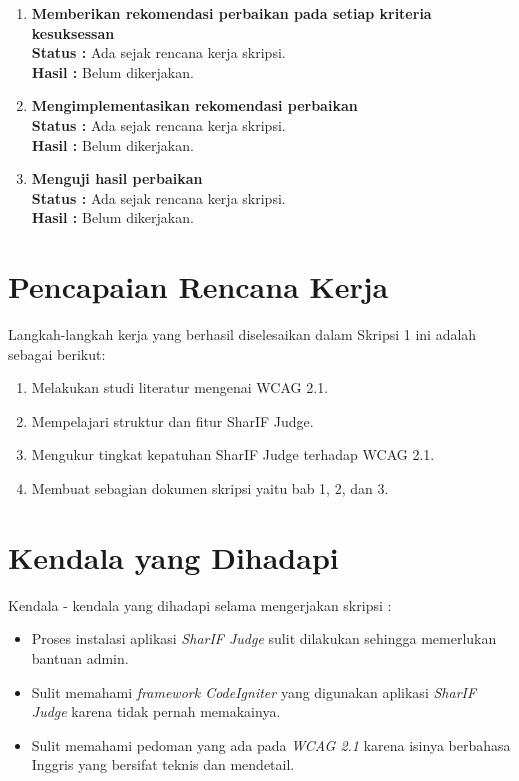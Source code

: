 \documentclass[a4paper,twoside]{article}
\begin{document}
\begin{enumerate}
		\item \textbf{Memberikan rekomendasi perbaikan pada setiap kriteria kesuksessan}\\
		{\bf Status :} Ada sejak rencana kerja skripsi.\\
		{\bf Hasil :} Belum dikerjakan.
		
		\item \textbf{Mengimplementasikan rekomendasi perbaikan}\\
		{\bf Status :} Ada sejak rencana kerja skripsi.\\
		{\bf Hasil :} Belum dikerjakan.

		\item \textbf{Menguji hasil perbaikan}\\
		{\bf Status :} Ada sejak rencana kerja skripsi.\\
		{\bf Hasil :} Belum dikerjakan.
		
	\end{enumerate}

\section{Pencapaian Rencana Kerja}
Langkah-langkah kerja yang berhasil diselesaikan dalam Skripsi 1 ini adalah sebagai berikut:
\begin{enumerate}
\item Melakukan studi literatur mengenai WCAG 2.1.
\item Mempelajari struktur dan fitur SharIF Judge.
\item Mengukur tingkat kepatuhan SharIF Judge terhadap WCAG 2.1.
\item Membuat sebagian dokumen skripsi yaitu bab 1, 2, dan 3.
\end{enumerate}

\section{Kendala yang Dihadapi}
Kendala - kendala yang dihadapi selama mengerjakan skripsi :
\begin{itemize}
	\item Proses instalasi aplikasi \textit{SharIF Judge} sulit dilakukan sehingga memerlukan bantuan admin.
	\item Sulit memahami \textit{framework CodeIgniter} yang digunakan aplikasi \textit{SharIF Judge} karena tidak pernah memakainya.
	\item Sulit memahami pedoman yang ada pada \textit{WCAG 2.1} karena isinya berbahasa Inggris yang bersifat teknis dan mendetail.
\end{itemize}
\end{document}

